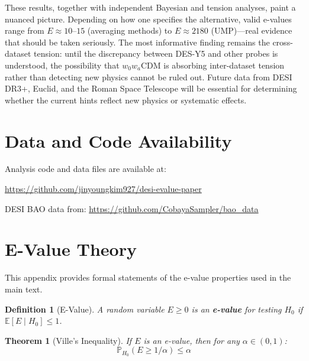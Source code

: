 \documentclass[11pt,a4paper]{article}
\newtheorem{definition}{Definition}
\newtheorem{theorem}{Theorem}
\newcommand{\E}{\mathbb{E}}
\newcommand{\Prob}{\mathbb{P}}
\begin{document}
These results, together with independent Bayesian \citep{OngBayesian2025} and tension \citep{WangMota2025} analyses, paint a nuanced picture. Depending on how one specifies the alternative, valid e-values range from $E \approx 10$--$15$ (averaging methods) to $E \approx 2180$ (UMP)---real evidence that should be taken seriously. The most informative finding remains the cross-dataset tension: until the discrepancy between DES-Y5 and other probes is understood, the possibility that $w_0w_a$CDM is absorbing inter-dataset tension rather than detecting new physics cannot be ruled out. Future data from DESI DR3+, Euclid, and the Roman Space Telescope will be essential for determining whether the current hints reflect new physics or systematic effects.

\section*{Data and Code Availability}

Analysis code and data files are available at:
\begin{center}
\url{https://github.com/jinyoungkim927/desi-evalue-paper}
\end{center}

DESI BAO data from: \url{https://github.com/CobayaSampler/bao_data}

\appendix
\section{E-Value Theory}
\label{app:proofs}

This appendix provides formal statements of the e-value properties used in the main text.

\begin{definition}[E-Value]
A random variable $E \geq 0$ is an \textbf{e-value} for testing $H_0$ if $\E[E \mid H_0] \leq 1$.
\end{definition}

\begin{theorem}[Ville's Inequality]
\label{thm:ville}
If $E$ is an e-value, then for any $\alpha \in (0,1)$:
\begin{equation}
\Prob_{H_0}(E \geq 1/\alpha) \leq \alpha
\end{equation}
\end{theorem}
\end{document}
